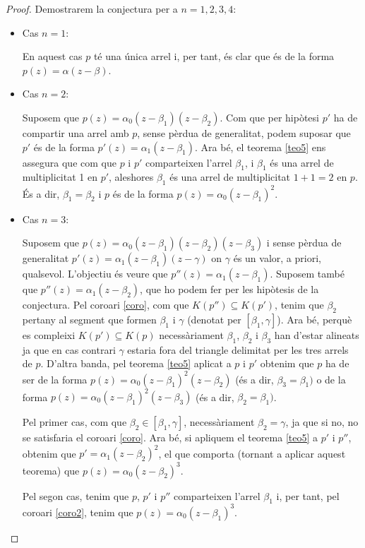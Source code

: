 \documentclass[11pt,a4paper]{article}
\theoremstyle{definition}
\begin{document}
\begin{proof}
    Demostrarem la conjectura per a $n=1,2,3,4$:
    \begin{itemize}
        \item Cas $n=1$:\par
              En aquest cas $p$ té una única arrel i, per tant, és clar que és de la forma $p(z)=\alpha(z-\beta)$.
        \item Cas $n=2$:\par
              Suposem que $p(z)=\alpha_0(z-\beta_1)(z-\beta_2)$. Com que per hipòtesi $p'$ ha de compartir una arrel amb $p$, sense pèrdua de generalitat, podem suposar que $p'$ és de la forma $p'(z)=\alpha_1(z-\beta_1)$. Ara bé, el teorema \ref{teo5} ens assegura que com que $p$ i $p'$ comparteixen l'arrel $\beta_1$, i $\beta_1$ és una arrel de multiplicitat 1 en $p'$, aleshores $\beta_1$ és una arrel de multiplicitat $1+1=2$ en $p$. És a dir, $\beta_1=\beta_2$ i $p$ és de la forma $p(z)=\alpha_0(z-\beta_1)^2$.
        \item Cas $n=3$:\par
              Suposem que $p(z)=\alpha_0(z-\beta_1)(z-\beta_2)(z-\beta_3)$ i sense pèrdua de generalitat $p'(z)=\alpha_1(z-\beta_1)(z-\gamma)$ on $\gamma$ és un valor, a priori, qualsevol. L'objectiu és veure que $p''(z)=\alpha_1(z-\beta_1)$. Suposem també que $p''(z)=\alpha_1(z-\beta_2)$, que ho podem fer per les hipòtesis de la conjectura. Pel coro\lgem ari \ref{coro}, com que $K(p'')\subseteq K(p')$, tenim que $\beta_2$ pertany al segment que formen $\beta_1$ i $\gamma$ (denotat per $[\beta_1,\gamma]$). Ara bé, perquè es compleixi $K(p')\subseteq K(p)$ necessàriament $\beta_1$, $\beta_2$ i $\beta_3$ han d'estar alineats ja que en cas contrari $\gamma$ estaria fora del triangle delimitat per les tres arrels de $p$. D'altra banda, pel teorema \ref{teo5} aplicat a $p$ i $p'$ obtenim que $p$ ha de ser de la forma $p(z)=\alpha_0(z-\beta_1)^2(z-\beta_2)$ (és a dir, $\beta_3=\beta_1)$ o de la forma $p(z)=\alpha_0(z-\beta_1)^2(z-\beta_3)$ (és a dir, $\beta_2=\beta_1)$.\par Pel primer cas, com que $\beta_2\in[\beta_1,\gamma]$, necessàriament $\beta_2=\gamma$, ja que si no, no se satisfaria el coro\lgem ari \ref{coro}. Ara bé, si apliquem el teorema \ref{teo5} a $p'$ i $p''$, obtenim que $p'=\alpha_1(z-\beta_2)^2$, el que comporta (tornant a aplicar aquest teorema) que $p(z)=\alpha_0(z-\beta_2)^3$.\par Pel segon cas, tenim que $p$, $p'$ i $p''$ comparteixen l'arrel $\beta_1$ i, per tant, pel coro\lgem ari \ref{coro2}, tenim que $p(z)=\alpha_0(z-\beta_1)^3$.

\end{itemize}
\end{proof}
\end{document}
